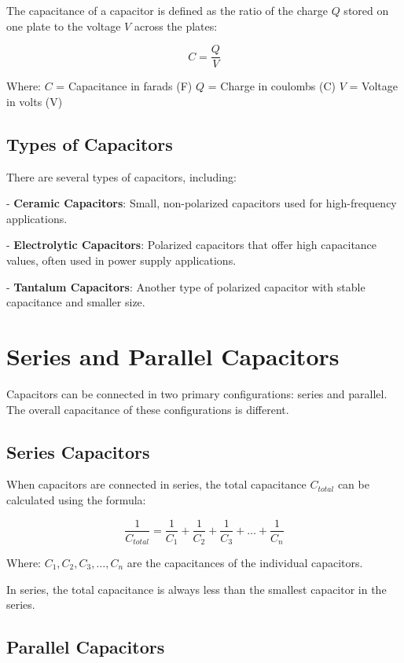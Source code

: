 \documentclass[openany]{book}
\begin{document}
The capacitance of a capacitor is defined as the ratio of the charge \(Q\) stored on one plate to the voltage \(V\) across the plates:

\[
C = \frac{Q}{V}
\]

Where:
 \(C\) = Capacitance in farads (F)
 \(Q\) = Charge in coulombs (C)
 \(V\) = Voltage in volts (V)

\subsection{Types of Capacitors}

There are several types of capacitors, including:

- \textbf{Ceramic Capacitors}: Small, non-polarized capacitors used for high-frequency applications.

- \textbf{Electrolytic Capacitors}: Polarized capacitors that offer high capacitance values, often used in power supply applications.

- \textbf{Tantalum Capacitors}: Another type of polarized capacitor with stable capacitance and smaller size.

\section{Series and Parallel Capacitors}

Capacitors can be connected in two primary configurations: series and parallel. The overall capacitance of these configurations is different.

\subsection{Series Capacitors}

When capacitors are connected in series, the total capacitance \(C_{total}\) can be calculated using the formula:

\[
\frac{1}{C_{total}} = \frac{1}{C_1} + \frac{1}{C_2} + \frac{1}{C_3} + \ldots + \frac{1}{C_n}
\]

Where:
\(C_1, C_2, C_3, \ldots, C_n\) are the capacitances of the individual capacitors.

In series, the total capacitance is always less than the smallest capacitor in the series.

\subsection{Parallel Capacitors}
\end{document}
